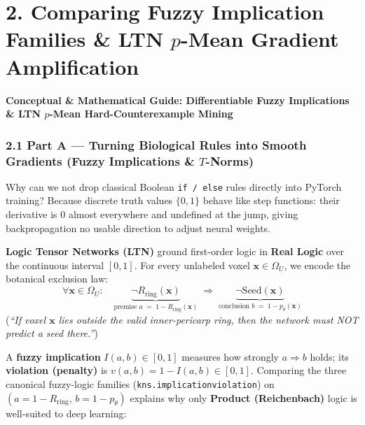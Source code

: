 \documentclass[10pt,a4paper]{article}
\renewcommand{\_}{\origunderscore\allowbreak}
\begin{document}
\section*{2. Comparing Fuzzy Implication Families \& LTN $p$-Mean Gradient Amplification}

\begin{guidehdr}
{\small\bfseries\color{kiwigreen!75!black}Conceptual \& Mathematical Guide: Differentiable Fuzzy Implications \& LTN $p$-Mean Hard-Counterexample Mining}
\end{guidehdr}

\subsubsection*{2.1 Part A --- Turning Biological Rules into Smooth Gradients (Fuzzy Implications \& $T$-Norms)}
Why can we not drop classical Boolean \texttt{if /\allowbreak{} else} rules directly into PyTorch training? Because discrete truth values $\{0, 1\}$ behave like step functions: their derivative is $0$ almost everywhere and undefined at the jump, giving backpropagation no usable direction to adjust neural weights.

\textbf{Logic Tensor Networks (LTN)} ground first-order logic in \textbf{Real Logic} over the continuous interval $[0, 1]$. For every unlabeled voxel $\mathbf{x} \in \Omega_U$, we encode the botanical exclusion law:
\[
\forall \mathbf{x} \in \Omega_U:\quad \underbrace{\neg R_{\text{ring}}(\mathbf{x})}_{\text{premise } a \;=\; 1 - R_{\text{ring}}(\mathbf{x})} \;\Longrightarrow\; \underbrace{\neg \text{Seed}(\mathbf{x})}_{\text{conclusion } b \;=\; 1 - p_\theta(\mathbf{x})}
\]
(\textit{``If voxel $\mathbf{x}$ lies outside the valid inner-pericarp ring, then the network must NOT predict a seed there.''})

A \textbf{fuzzy implication} $I(a, b) \in [0, 1]$ measures how strongly $a \Rightarrow b$ holds; its \textbf{violation (penalty)} is $v(a, b) = 1 - I(a, b) \in [0, 1]$. Comparing the three canonical fuzzy-logic families (\texttt{kns.implication\_violation}) on $(a = 1 - R_{\text{ring}},\, b = 1 - p_\theta)$ explains why only \textbf{Product (Reichenbach)} logic is well-suited to deep learning:
\end{document}
